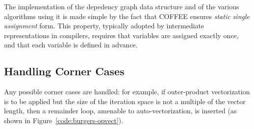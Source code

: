 The implementation of the depedency graph data structure and of the various algorithms using it is made simple by the fact that COFFEE ensures \textit{static single assignment} form. This property, typically adopted by intermediate representations in compilers, requires that variables are assigned exactly once, and that each variable is defined in advance. 

\subsection{Handling Corner Cases}
Any possible corner cases are handled: for example, if outer-product vectorization is to be applied but the size of the iteration space is not a multiple of the vector length, then a remainder loop, amenable to auto-vectorization, is inserted (as shown in Figure~\ref{code:burgers-opvect}).